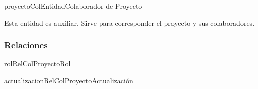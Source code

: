 \begin{BusinessEntity}{proyectoColEntidad}{Colaborador de Proyecto}
	\item Esta entidad es auxiliar. Sirve para corresponder el proyecto y sus colaboradores.
\end{BusinessEntity}

\subsubsection{Relaciones}
\begin{BusinessFact}{rolRelColProyecto}{Rol}
\end{BusinessFact}

\begin{BusinessFact}{actualizacionRelColProyecto}{Actualización}
\end{BusinessFact}